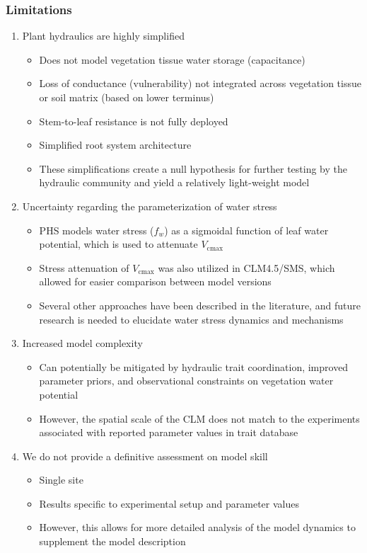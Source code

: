 \documentclass[draft,linenumbers]{agujournal}
\begin{document}
\subsubsection{Limitations}
\begin{enumerate}
    \item Plant hydraulics are highly simplified
    \begin{itemize}
        \item Does not model vegetation tissue water storage (capacitance)
        \item Loss of conductance (vulnerability) not integrated across vegetation tissue or soil matrix (based on lower terminus)
        \item Stem-to-leaf resistance is not fully deployed
        \item Simplified root system architecture
        \item These simplifications create a null hypothesis for further testing by the hydraulic community and yield a relatively light-weight model
    \end{itemize}
    \item Uncertainty regarding the parameterization of water stress
    \begin{itemize}
        \item PHS models water stress ($f_w$) as a sigmoidal function of leaf water potential, which is used to attenuate $V_{\text{cmax}}$
        \item Stress attenuation of $V_{\text{cmax}}$ was also utilized in CLM4.5/SMS, which allowed for easier comparison between model versions
        \item Several other approaches have been described in the literature, and future research is needed to elucidate water stress dynamics and mechanisms
    \end{itemize}
    \item Increased model complexity
    \begin{itemize}
    	\item Can potentially be mitigated by hydraulic trait coordination, improved parameter priors, and observational constraints on vegetation water potential
        \item However, the spatial scale of the CLM does not match to the experiments associated with reported parameter values in trait database 
    \end{itemize}
    \item We do not provide a definitive assessment on model skill
    \begin{itemize}
        \item Single site
        \item Results specific to experimental setup and parameter values
        \item However, this allows for more detailed analysis of the model dynamics to supplement the model description
    \end{itemize}
    
\end{enumerate}
\end{document}
